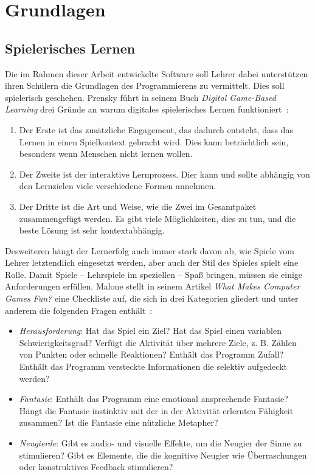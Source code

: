 \chapter{Grundlagen}
\label{sec:basics}

\section{Spielerisches Lernen}

Die im Rahmen dieser Arbeit entwickelte Software soll Lehrer dabei unterstützen ihren Schülern die Grundlagen des Programmierens zu vermittelt. Dies soll spielerisch geschehen. Prensky führt in seinem Buch \textit{Digital Game-Based Learning} drei Gründe an warum digitales spielerisches Lernen funktioniert~\cite[147]{prensky2007}:

\begin{enumerate}
    \item Der Erste ist das zusätzliche Engagement, das dadurch entsteht, dass das Lernen in einen Spielkontext gebracht wird. Dies kann beträchtlich sein, besonders wenn Menschen nicht lernen wollen.
    \item Der Zweite ist der interaktive Lernprozess. Dier kann und sollte abhängig von den Lernzielen viele verschiedene Formen annehmen.
    \item Der Dritte ist die Art und Weise, wie die Zwei im Gesamtpaket zusammengefügt werden. Es gibt viele Möglichkeiten, dies zu tun, und die beste Lösung ist sehr kontextabhängig.
\end{enumerate}

Desweiteren hängt der Lernerfolg auch immer stark davon ab, wie Spiele vom Lehrer letztendlich eingesetzt werden, aber auch der Stil des Spieles spielt eine Rolle. Damit Spiele -- Lehrspiele im speziellen -- Spaß bringen, müssen sie einige Anforderungen erfüllen. Malone stellt in seinem Artikel \textit{What Makes Computer Games Fun?} eine Checkliste auf, die sich in drei Kategorien gliedert und unter anderem die folgenden Fragen enthält~\cite[49]{malone1981}:

\begin{itemize}
    \item \emph{Herausforderung}: Hat das Spiel ein Ziel? Hat das Spiel einen variablen Schwierigkeitsgrad? Verfügt die Aktivität über mehrere Ziele, z. B. Zählen von Punkten oder schnelle Reaktionen? Enthält das Programm Zufall? Enthält das Programm versteckte Informationen die selektiv aufgedeckt werden?
    \item \emph{Fantasie}: Enthält das Programm eine emotional ansprechende Fantasie? Hängt die Fantasie instinktiv mit der in der Aktivität erlernten Fähigkeit zusammen? Ist die Fantasie eine nützliche Metapher?
    \item \emph{Neugierde}: Gibt es audio- und visuelle Effekte, um die Neugier der Sinne zu stimulieren? Gibt es Elemente, die die kognitive Neugier wie Überraschungen oder konstruktives Feedback stimulieren?
\end{itemize}

